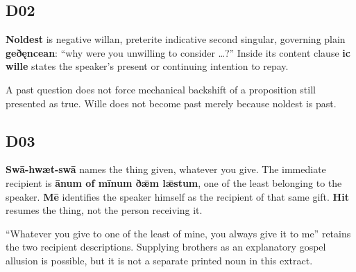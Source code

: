 \subsection*{D02}

\par\begin{minipage}{\linewidth}\raggedright
\textbf{Noldest} is negative willan, preterite indicative second singular, governing plain \textbf{geðęncean}: “why were you unwilling to consider …?” Inside its content clause \textbf{ic wille} states the speaker’s present or continuing intention to repay.

A past question does not force mechanical backshift of a proposition still presented as true. Wille does not become past merely because noldest is past.

\end{minipage}\par\addvspace{4pt}

\subsection*{D03}

\par\begin{minipage}{\linewidth}\raggedright
\textbf{Swā-hwæt-swā} names the thing given, whatever you give. The immediate recipient is \textbf{ānum of mīnum ðǣm lǣstum}, one of the least belonging to the speaker. \textbf{Mē} identifies the speaker himself as the recipient of that same gift. \textbf{Hit} resumes the thing, not the person receiving it.

“Whatever you give to one of the least of mine, you always give it to me” retains the two recipient descriptions. Supplying brothers as an explanatory gospel allusion is possible, but it is not a separate printed noun in this extract.

\end{minipage}\par\addvspace{4pt}

